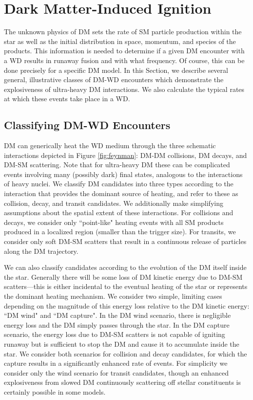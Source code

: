 \documentclass[twocolumn, preprintnumbers,amsmath,amssymb,prd, superscriptaddress]{revtex4}
\begin{document}
\section{Dark Matter-Induced Ignition}
\label{sec:DMexplode}

The unknown physics of DM sets the rate of SM particle production within the star as well as the initial distribution in space, momentum, and species of the products.
This information is needed to determine if a given DM encounter with a WD results in runaway fusion and with what frequency.
Of course, this can be done precisely for a specific DM model.
In this Section, we describe several general, illustrative classes of DM-WD encounters which demonstrate the explosiveness of ultra-heavy DM interactions.
We also calculate the typical rates at which these events take place in a WD.

\subsection{Classifying DM-WD Encounters}

DM can generically heat the WD medium through the three schematic interactions depicted in Figure \ref{fig:feynman}: DM-DM collisions, DM decays, and DM-SM scattering.
Note that for ultra-heavy DM these can be complicated events involving many (possibly dark) final states, analogous to the interactions of heavy nuclei.
We classify DM candidates into three types according to the interaction that provides the dominant source of heating, and refer to these as collision, decay, and transit candidates.
We additionally make simplifying assumptions about the spatial extent of these interactions.
For collisions and decays, we consider only ``point-like" heating events with all SM products produced in a localized region (smaller than the trigger size).
For transits, we consider only soft DM-SM scatters that result in a continuous release of particles along the DM trajectory.

We can also classify candidates according to the evolution of the DM itself inside the star.
Generally there will be some loss of DM kinetic energy due to DM-SM scatters---this is either incidental to the eventual heating of the star or represents the dominant heating mechanism.
We consider two simple, limiting cases depending on the magnitude of this energy loss relative to the DM kinetic energy: ``DM wind" and ``DM capture".
In the DM wind scenario, there is negligible energy loss and the DM simply passes through the star.
In the DM capture scenario, the energy loss due to DM-SM scatters is not capable of igniting runaway but is sufficient to stop the DM and cause it to accumulate inside the star.
We consider both scenarios for collision and decay candidates, for which the capture results in a significantly enhanced rate of events.
For simplicity we consider only the wind scenario for transit candidates, though an enhanced explosiveness from slowed DM continuously scattering off stellar constituents is certainly possible in some models.
\end{document}
